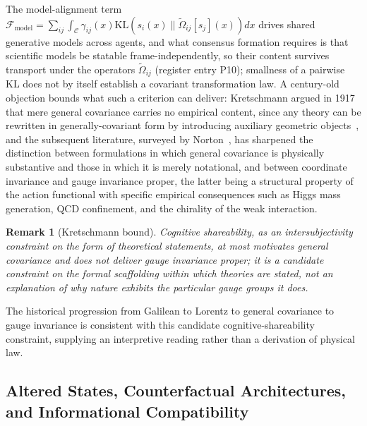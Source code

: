 \documentclass[11pt]{article}
\newtheorem{remark}{Remark}
\begin{document}
The model-alignment term $\mathcal{F}_{\text{model}} = \sum_{ij} \int_{\mathcal{C}} \gamma_{ij}(x) \mathrm{KL}(s_i(x) \| \tilde{\Omega}_{ij}[s_j](x))  dx$ drives shared generative models across agents, and what consensus formation requires is that scientific models be statable frame-independently, so their content survives transport under the operators $\tilde{\Omega}_{ij}$ (register entry P10); smallness of a pairwise KL does not by itself establish a covariant transformation law. A century-old objection bounds what such a criterion can deliver: Kretschmann argued in 1917 that mere general covariance carries no empirical content, since any theory can be rewritten in generally-covariant form by introducing auxiliary geometric objects~\cite{Kretschmann1917}, and the subsequent literature, surveyed by Norton~\cite{Norton1993}, has sharpened the distinction between formulations in which general covariance is physically substantive and those in which it is merely notational, and between coordinate invariance and gauge invariance proper, the latter being a structural property of the action functional with specific empirical consequences such as Higgs mass generation, QCD confinement, and the chirality of the weak interaction.
\begin{remark}[Kretschmann bound]\label{rem:kretschmann}
Cognitive shareability, as an intersubjectivity constraint on the form of theoretical statements, at most motivates general covariance and does not deliver gauge invariance proper; it is a candidate constraint on the formal scaffolding within which theories are stated, not an explanation of why nature exhibits the particular gauge groups it does.
\end{remark}
The historical progression from Galilean to Lorentz to general covariance to gauge invariance is consistent with this candidate cognitive-shareability constraint, supplying an interpretive reading rather than a derivation of physical law.

\subsection{Altered States, Counterfactual Architectures, and Informational Compatibility}
\end{document}
